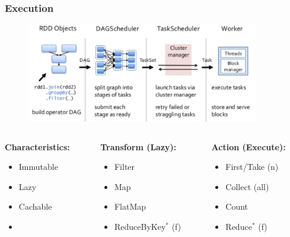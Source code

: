 \documentclass[xcolor={dvipsnames}]{beamer}
\begin{document}
\frame
{
\frametitle{Execution}

\begin{figure}
\includegraphics[width=4in]{stuff/spark3.jpg}
\end{figure}



\begin{columns}

\begin{column}{.33\textwidth}

\textbf{Characteristics:} 
\begin{itemize}
\item Immutable 
\item Lazy
\item Cachable 
\item[]
\end{itemize} 



\end{column}
\begin{column}{.35\textwidth}


\textbf{Transform (Lazy):} 
\begin{itemize}
\item Filter
\item Map
\item FlatMap
\item ReduceByKey$^*$ (f)
\end{itemize} 

\end{column}

\begin{column}{.33\textwidth}

\textbf{Action (Execute):} 
\begin{itemize}
\item First/Take (n)
\item Collect (all)
\item Count 
\item Reduce$^*$ (f)
\end{itemize} 
\end{column}


\end{columns}


}
\end{document}
